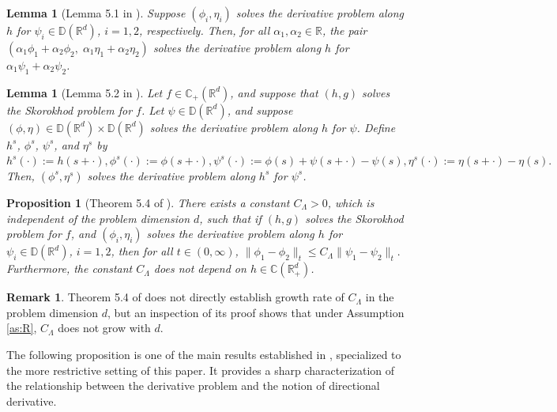 \documentclass[11pt]{article}
\theoremstyle{definition}
\newtheorem{remark}[assumption]{Remark}
\theoremstyle{plain}
\newtheorem{proposition}[assumption]{Proposition}
\newtheorem{lemma}[assumption]{Lemma}
\newcommand{\R}{\mathbb{R}}
\newcommand{\C}{\mathbb{C}}
\newcommand{\D}{\mathbb{D}}
\begin{document}
\begin{lemma}[Lemma 5.1 in \cite{LipshutzRamanan2018}]\label{lem:linearity}
Suppose \( (\phi_i, \eta_i) \) solves the derivative problem along \( h \) for \( \psi_i \in \D(\mathbb{R}^d) \), $i = 1, 2$, respectively.  
Then, for all \( \alpha_1, \alpha_2 \in \mathbb{R} \), the pair
\(
(\alpha_1 \phi_1 + \alpha_2 \phi_2,\; \alpha_1 \eta_1 + \alpha_2 \eta_2)
\)
solves the derivative problem along \( h \) for \( \alpha_1 \psi_1 + \alpha_2 \psi_2 \).
\end{lemma}

\begin{lemma}[Lemma 5.2 in \cite{LipshutzRamanan2018}]\label{lem:shift}
Let \( f \in \C_+(\R^d) \), and suppose that \( (h,g) \) solves the Skorokhod problem for \( f \).  
Let \( \psi \in \D(\mathbb{R}^d) \), and suppose \( (\phi, \eta) \in \D(\mathbb{R}^d)\times \D(\mathbb{R}^d) \) solves the {\em derivative problem} along \( h \) for \( \psi \).
Define $h^s$, $\phi^s$, $\psi^s$, and $\eta^s$ by 
\(
h^s(\cdot) := h(s+ \cdot), \phi^s(\cdot) := \phi(s+\cdot), \psi^s(\cdot) := \phi(s) + \psi(s+\cdot) - \psi(s), \eta^s(\cdot) := \eta(s+\cdot) - \eta(s).
\)
Then, $(\phi^s, \eta^s)$ solves the derivative problem along $h^s$ for $\psi^s$.
\end{lemma}

\begin{proposition}[Theorem 5.4 of \cite{LipshutzRamanan2018}]
There exists a constant \( C_\Lambda > 0\), which is independent of the problem dimension $d$, 
such that if \( (h,g) \) solves the Skorokhod problem for \( f \),  
and \( (\phi_i, \eta_i) \) solves the derivative problem along \( h \) for \( \psi_i \in \D(\mathbb{R}^d) \), \( i = 1,2 \),  
then for all \( t \in (0,\infty) \),
\(
\| \phi_1 - \phi_2 \|_t \le C_\Lambda \| \psi_1 - \psi_2 \|_t.
\)
Furthermore, the constant \( C_\Lambda \) does not depend on \( h \in \C(\R_+^d) \).
\end{proposition}
\begin{remark}
Theorem 5.4 of \cite{LipshutzRamanan2018} does not directly establish growth rate of $C_\Lambda$ 
in the problem dimension $d$, but an inspection of its proof shows that under Assumption \ref{as:R}, $C_\Lambda$ does not grow with $d$. 
\end{remark}

The following proposition is one of the main results established in \cite{LipshutzRamanan2018},  
specialized to the more restrictive setting of this paper.  
It provides a sharp characterization of the relationship between the derivative problem and the notion of directional derivative.
\end{document}
